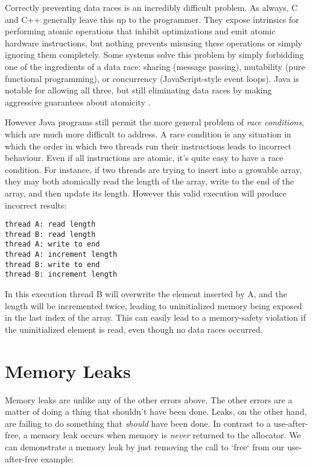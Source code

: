 Correctly preventing data races is an incredibly difficult problem. As always,
C and C++ generally leave this up to the programmer. They expose intrinsics for
performing atomic operations that inhibit optimizations and emit atomic hardware
instructions, but nothing prevents misusing these operations or simply ignoring
them completely. Some systems solve this problem by simply forbidding one
of the ingredients of a data race: sharing (message passing), mutability
(pure functional programming), or concurrency (JavaScript-style event loops).
Java is notable for allowing all three, but still eliminating data races by
making aggressive guarantees about atomicity \cite{aspinall2007formalising}.

However Java programs still permit the more general problem of
\emph{race conditions}, which are much more difficult to address. A race condition
is any situation in which the order in which two threads run their instructions
leads to incorrect behaviour. Even if all instructions are atomic, it's quite easy
to have a race condition. For instance, if two threads are trying to insert into
a growable array, they may both atomically read the length of the array,
write to the end of the array, and then update its length. However this valid
execution will produce incorrect results:

\begin{verbatim}
thread A: read length
thread B: read length
thread A: write to end
thread A: increment length
thread B: write to end
thread B: increment length
\end{verbatim}

In this execution thread B will overwrite the element inserted by A, and the length
will be incremented twice, leading to uninitialized memory being exposed in the last
index of the array. This can easily lead to a memory-safety violation if the
uninitialized element is read, even though no data races occurred.





\section{Memory Leaks}

Memory leaks are unlike any of the other errors above. The other errors are a matter
of doing a thing that shouldn't have been done. Leaks, on the other hand, are
failing to do something that \emph{should} have been done. In contrast to a
use-after-free, a memory leak occurs when memory is \emph{never} returned to the allocator.
We can demonstrate a memory leak by just removing the call to `free` from our
use-after-free example:

